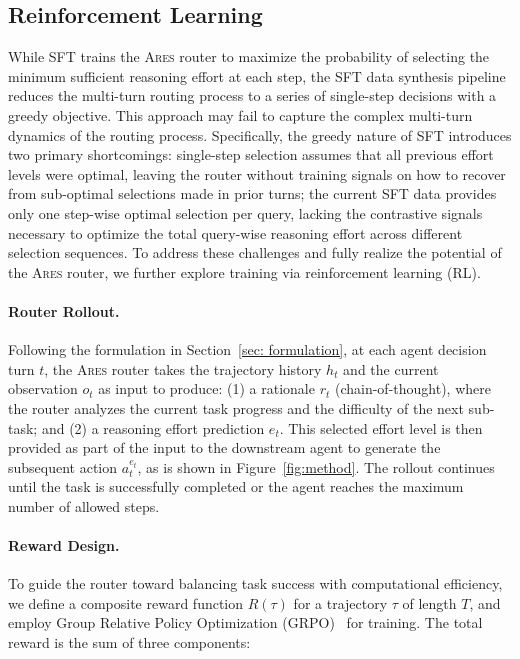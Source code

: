 \documentclass{article}
\theoremstyle{plain}
\theoremstyle{definition}
\theoremstyle{remark}
\begin{document}
\subsection{Reinforcement Learning}

While SFT trains the \textsc{Ares} router to maximize the probability of selecting the minimum sufficient reasoning effort at each step, the SFT data synthesis pipeline reduces the multi-turn routing process to a series of single-step decisions with a greedy objective. This approach may fail to capture the complex multi-turn dynamics of the routing process. Specifically, the greedy nature of SFT introduces two primary shortcomings:  single-step selection assumes that all previous effort levels were optimal, leaving the router without training signals on how to recover from sub-optimal selections made in prior turns;  the current SFT data provides only one step-wise optimal selection per query, lacking the contrastive signals necessary to optimize the total query-wise reasoning effort across different selection sequences. To address these challenges and fully realize the potential of the \textsc{Ares} router, we further explore training via reinforcement learning (RL).

\paragraph{Router Rollout.} 
Following the formulation in Section~\ref{sec: formulation}, at each agent decision turn $t$, the \textsc{Ares} router takes the trajectory history $h_t$ and the current observation $o_t$ as input to produce: (1) a rationale $r_t$ (chain-of-thought), where the router analyzes the current task progress and the difficulty of the next sub-task; and (2) a reasoning effort prediction $e_t$. This selected effort level is then provided as part of the input to the downstream agent to generate the subsequent action $a^{e_t}_t$, as is shown in Figure~\ref{fig:method}. The rollout continues until the task is successfully completed or the agent reaches the maximum number of allowed steps.


\paragraph{Reward Design.} 
To guide the router toward balancing task success with computational efficiency, we define a composite reward function $R(\tau)$ for a trajectory $\tau$ of length $T$, and employ Group Relative Policy Optimization (GRPO)~\citep{shao2024deepseekmath} for training. The total reward is the sum of three components:
\end{document}
